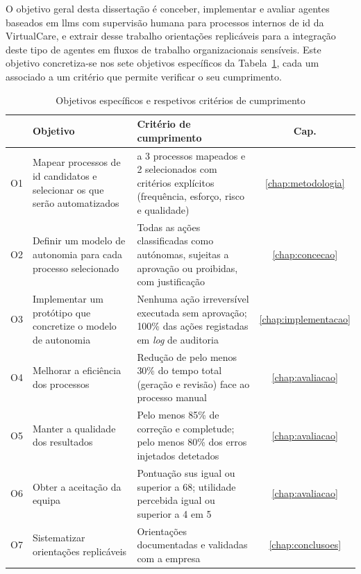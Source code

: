 O objetivo geral desta dissertação é conceber, implementar e avaliar agentes baseados em \glspl{llm} com supervisão humana para processos internos de \gls{id} da VirtualCare, e extrair desse trabalho orientações replicáveis para a integração deste tipo de agentes em fluxos de trabalho organizacionais sensíveis. Este objetivo concretiza-se nos sete objetivos específicos da Tabela~\ref{tab:objetivos}, cada um associado a um critério que permite verificar o seu cumprimento.

\begin{table}[htbp]
  \centering
  \caption{Objetivos específicos e respetivos critérios de cumprimento}
  \label{tab:objetivos}
  \small
  \begin{tabularx}{\textwidth}{@{}l >{\raggedright\arraybackslash}X >{\raggedright\arraybackslash}X c@{}}
    \toprule
    & \textbf{Objetivo} & \textbf{Critério de cumprimento} & \textbf{Cap.} \\
    \midrule
    O1 & Mapear processos de \gls{id} candidatos e selecionar os que serão automatizados & 2 a 3 processos mapeados e 2 selecionados com critérios explícitos (frequência, esforço, risco e qualidade) & \ref{chap:metodologia} \\
    \addlinespace
    O2 & Definir um modelo de autonomia para cada processo selecionado & Todas as ações classificadas como autónomas, sujeitas a aprovação ou proibidas, com justificação & \ref{chap:concecao} \\
    \addlinespace
    O3 & Implementar um protótipo que concretize o modelo de autonomia & Nenhuma ação irreversível executada sem aprovação; 100\% das ações registadas em \textit{log} de auditoria & \ref{chap:implementacao} \\
    \addlinespace
    O4 & Melhorar a eficiência dos processos & Redução de pelo menos 30\% do tempo total (geração e revisão) face ao processo manual & \ref{chap:avaliacao} \\
    \addlinespace
    O5 & Manter a qualidade dos resultados & Pelo menos 85\% de correção e completude; pelo menos 80\% dos erros injetados detetados & \ref{chap:avaliacao} \\
    \addlinespace
    O6 & Obter a aceitação da equipa & Pontuação \gls{sus} igual ou superior a 68; utilidade percebida igual ou superior a 4 em 5 & \ref{chap:avaliacao} \\
    \addlinespace
    O7 & Sistematizar orientações replicáveis & Orientações documentadas e validadas com a empresa & \ref{chap:conclusoes} \\
    \bottomrule
  \end{tabularx}
\end{table}

